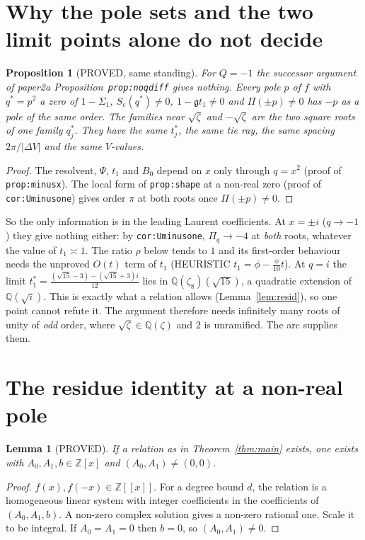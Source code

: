 \documentclass[11pt]{article}
\newtheorem{lemma}[theorem]{Lemma}
\newtheorem{proposition}[theorem]{Proposition}
\theoremstyle{remark}
\newcommand{\Q}{\mathbb Q}
\newcommand{\Z}{\mathbb Z}
\begin{document}
\section{Why the pole sets and the two limit points alone do not decide}\label{sec:nogo}

\begin{proposition}[PROVED, same standing]\label{prop:sym}
For $Q=-1$ the successor argument of paper2a Proposition~\texttt{prop:noqdiff} gives nothing. Every pole
$p$ of $f$ with $q^\ast=p^2$ a zero of $1-\Sigma_1$, $S_e(q^\ast)\ne0$, $1-\mathfrak g t_1\ne0$ and
$\Pi(\pm p)\ne0$ has $-p$ as a pole of the same order. The families near $\sqrt\zeta$ and $-\sqrt\zeta$ are
the two square roots of \emph{one} family $q^\ast_j$. They have the same $t^\ast_j$, the same tie ray, the same
spacing $2\pi/|\Delta V|$ and the same $V$-values.
\end{proposition}
\begin{proof}
The resolvent, $\Psi$, $t_1$ and $B_0$ depend on $x$ only through $q=x^2$ (proof of \texttt{prop:minusx}).
The local form of \texttt{prop:shape} at a non-real zero (proof of \texttt{cor:Uminusone}) gives order $\pi$
at both roots once $\Pi(\pm p)\ne0$.
\end{proof}

\noindent So the only information is in the leading Laurent coefficients. At $x=\pm i$ ($q\to-1$) they give
nothing either: by \texttt{cor:Uminusone}, $\Pi_q\to-4$ at \emph{both} roots, whatever the value of
$t_1\asymp1$. The ratio $\rho$ below tends to $1$ and its first-order behaviour needs the unproved
$O(t)$ term of $t_1$ (HEURISTIC $t_1=\phi-\frac\phi{10}t$). At $q=i$ the limit
$t_1^\ast=\frac{(\sqrt{15}-3)-(\sqrt{15}+3)i}{12}$ lies in $\Q(\zeta_8)(\sqrt{15})$, a quadratic extension
of $\Q(\sqrt i)$. This is exactly what a relation allows (Lemma~\ref{lem:resid}), so one point cannot
refute it. The argument therefore needs infinitely many roots of unity of \emph{odd} order, where
$\sqrt\zeta\in\Q(\zeta)$ and $2$ is unramified. The arc supplies them.

\section{The residue identity at a non-real pole}

\begin{lemma}[PROVED]\label{lem:rational}
If a relation as in Theorem~\ref{thm:main} exists, one exists with $A_0,A_1,b\in\Z[x]$ and
$(A_0,A_1)\ne(0,0)$.
\end{lemma}
\begin{proof}
$f(x),f(-x)\in\Z[[x]]$. For a degree bound $d$, the relation is a homogeneous linear system with integer
coefficients in the coefficients of $(A_0,A_1,b)$. A non-zero complex solution gives a non-zero rational one.
Scale it to be integral. If $A_0=A_1=0$ then $b=0$, so $(A_0,A_1)\ne0$.
\end{proof}
\end{document}
